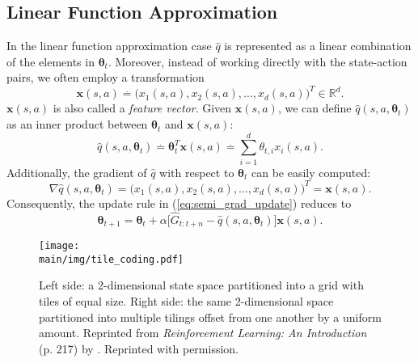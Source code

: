 \subsection{Linear Function Approximation}

In the linear function approximation case $\hat{q}$ is represented as a linear combination of the elements in $\boldsymbol\theta_t$. 
Moreover, instead of working directly with the state-action pairs, we often employ a transformation
%
\begin{equation}
\label{eq:feature_vec}
\textbf{x}(s,a) \overset{.}{=} \big( x_1(s,a), x_2(s,a), ..., x_d(s,a)\big)^T \in \mathbb{R}^d.
\end{equation}
%
$\textbf{x}(s,a)$ is also called a \textit{feature vector}. 
Given $\textbf{x}(s,a)$, we can define $\hat{q}(s,a,\boldsymbol\theta_t)$ as an inner product between $\boldsymbol\theta_t$ and $\textbf{x}(s,a)$:
%
\begin{equation}
\label{eq:inner_product_xtheta}
\hat{q}(s,a, \boldsymbol\theta_t) \overset{.}{=} \boldsymbol\theta^T_t \textbf{x}(s,a) \overset{.}{=} \sum^d_{i=1} \theta_{t,i} x_i(s,a).
\end{equation}
Additionally, the gradient of $\hat{q}$ with respect to $\boldsymbol\theta_t$ can be easily computed:
%
\begin{equation}
\nabla\hat{q}(s,a, \boldsymbol\theta_t) = \big(x_1(s,a), x_2(s,a), ..., 
	x_d(s,a)\big)^T = \textbf{x}(s,a).
\end{equation}
%
Consequently, the update rule in (\ref{eq:semi_grad_update}) reduces to
%
\begin{equation}
\label{eq:linear_semi_grad_update}
\boldsymbol\theta_{t+1} = \boldsymbol\theta_t + \alpha \big[ \hat{G}_{t:t+n} 
	- \hat{q}(s,a,\boldsymbol\theta_t) \big] \textbf{x}(s,a).
\end{equation}

\begin{figure}
    \centering
    \texttt{[image: \\main/img/tile\_coding.pdf]}
    \caption[Tile Coding] {Left side: a 2-dimensional state space partitioned into a grid with 
    tiles of equal size. Right side: the same 2-dimensional space partitioned into multiple 
    tilings offset from one another by a uniform amount. Reprinted from 
    \textit{Reinforcement Learning: An Introduction} (p. 217) by \citeauthor{sutton2018}. 
    Reprinted with permission.}
    \label{fig:tile_coding}
\end{figure}

